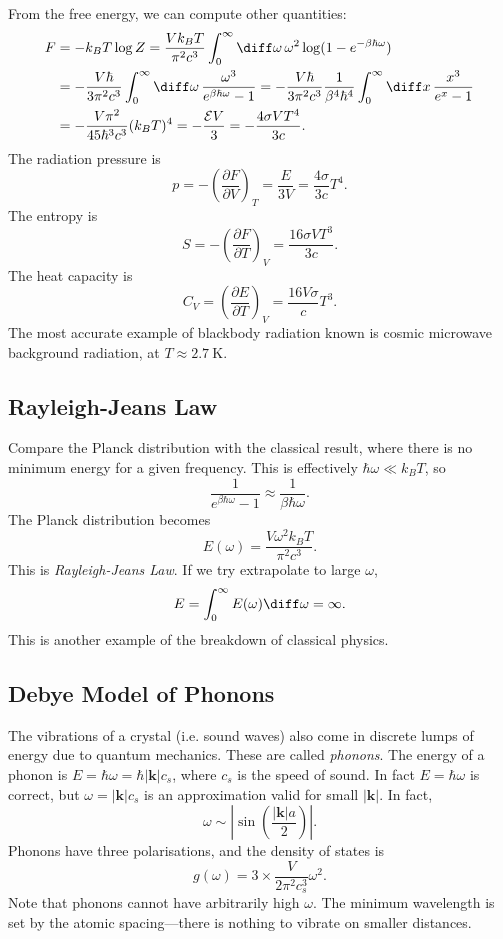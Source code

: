 \documentclass[12pt]{article}
\begin{document}
From the free energy, we can compute other quantities:
\begin{align*}
	F &= - k_B T \log Z = \frac{V k_B T}{\pi^2 c^3} \int_0^\infty \diff \omega \, \omega^2 \log(1 - e^{-\beta \hbar \omega}) \\
	  &= - \frac{V \hbar}{3 \pi^2 c^3} \int_0^\infty \diff \omega \, \frac{\omega^3}{e^{\beta \hbar \omega} - 1} = - \frac{V \hbar}{3 \pi^2 c^3} \frac{1}{\beta^4 \hbar^4} \int_0^\infty \diff x \, \frac{x^3}{e^{x} - 1} \\
	  &= - \frac{V\pi^2}{45 \hbar^3 c^3} (k_B T)^4 = - \frac{\mathcal{E} V}{3} = - \frac{4 \sigma VT^4}{3c}.
\end{align*}
The radiation pressure is
\[
p = - \left( \frac{\partial F}{\partial V} \right)_T = \frac{E}{3V} = \frac{4 \sigma}{3c} T^4.
\]
The entropy is
\[
S = - \left( \frac{\partial F}{\partial T} \right)_V = \frac{16 \sigma V T^3}{3c}.
\]
The heat capacity is
\[
C_V = \left( \frac{\partial E}{\partial T} \right)_V = \frac{16 V \sigma}{c} T^3.
\]
The most accurate example of blackbody radiation known is cosmic microwave background radiation, at $T \approx \qty{2.7}{\kelvin}$.

\subsection{Rayleigh-Jeans Law}
\label{sub:rjl}

Compare the Planck distribution with the classical result, where there is no minimum energy for a given frequency. This is effectively $\hbar \omega \ll k_B T$, so
\[
\frac{1}{e^{\beta \hbar \omega} - 1} \approx \frac{1}{\beta \hbar \omega}.
\]
The Planck distribution becomes
\[
E(\omega) = \frac{V \omega^2 k_B T}{\pi^2 c^3}.
\]
This is \emph{Rayleigh-Jeans Law}. If we try extrapolate to large $\omega$,
\[
E = \int_0^\infty E(\omega) \diff \omega = \infty.
\]
This is another example of the breakdown of classical physics.


\subsection{Debye Model of Phonons}
\label{sub:db_mod}

The vibrations of a crystal (i.e. sound waves) also come in discrete lumps of energy due to quantum mechanics. These are called \emph{phonons}. The energy of a phonon is $E = \hbar \omega = \hbar |\mathbf{k}| c_s$, where $c_s$ is the speed of sound. In fact $E = \hbar \omega$ is correct, but $\omega = |\mathbf{k}|c_s$ is an approximation valid for small $|\mathbf{k}|$. In fact,
\[
\omega \sim \left| \sin \left( \frac{|\mathbf{k}|a}{2} \right)\right|.
\]
Phonons have three polarisations, and the density of states is
\[
g(\omega) = 3 \times \frac{V}{2 \pi^2 c_s^3} \omega^2.
\]
Note that phonons cannot have arbitrarily high $\omega$. The minimum wavelength is set by the atomic spacing---there is nothing to vibrate on smaller distances.
\end{document}
